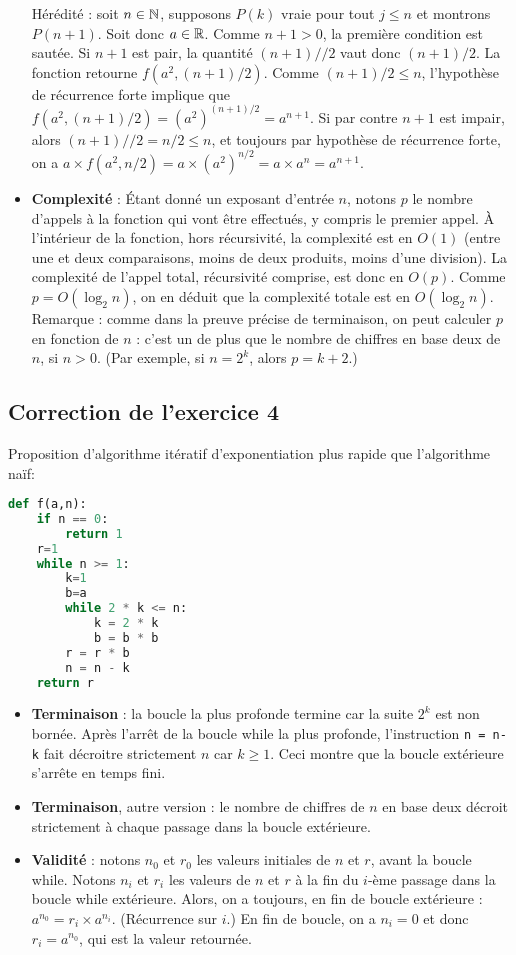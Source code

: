 \documentclass[11pt,a4paper]{article}
\begin{document}
\begin{itemize}
Hérédité : soit $n\in \mathbb{N}$, supposons $P(k)$ vraie pour tout $j\leq n$ et montrons $P(n+1)$. Soit donc $a\in \mathbb{R}$. Comme $n+1>0$, la première condition est sautée. Si $n+1$ est pair, la quantité $(n+1)//2$ vaut donc $(n+1)/2$. La fonction retourne $f(a^2,(n+1)/2)$. Comme $(n+1)/2\leq n$, l'hypothèse de récurrence forte implique que $f(a^2,(n+1)/2) = (a^2)^{(n+1)/2} = a^{n+1}$.
Si par contre $n+1$ est impair, alors $(n+1)//2 =n/2\leq n$, et toujours par hypothèse de récurrence forte, on a $a\times f(a^2,n/2) = a\times(a^2)^{n/2} = a\times a^n=a^{n+1}$.
\item \textbf{Complexité} : Étant donné un exposant d'entrée $n$, notons $p$ le nombre d'appels à la fonction qui vont être effectués, y compris le premier appel.
À l'intérieur de la fonction, hors récursivité, la complexité est en $O(1)$ (entre une et deux comparaisons, moins de deux produits, moins d'une division).
La complexité de l'appel total, récursivité comprise, est donc en $O(p)$. Comme $p  = O(\log_2 n)$, on en déduit que la complexité totale est en $O(\log_2 n)$.\\
Remarque : comme dans la preuve précise de terminaison, on peut calculer $p$ en fonction de $n$ : c'est un de plus que le nombre de chiffres en base deux de $n$, si $n>0$. (Par exemple, si $n=2^k$, alors $p=k+2$.) 
\end{itemize}

\subsection*{Correction de l'exercice 4}

Proposition d'algorithme itératif d'exponentiation plus rapide que l'algorithme naïf: 
\begin{lstlisting}[language=Python]
def f(a,n):
	if n == 0:
		return 1
	r=1
	while n >= 1:
		k=1
		b=a
		while 2 * k <= n:
			k = 2 * k
			b = b * b
		r = r * b
		n = n - k
	return r
\end{lstlisting}
\begin{itemize}
\item \textbf{Terminaison} : la boucle la plus profonde termine car la suite $2^k$ est non bornée.
Après l'arrêt de la boucle while la plus profonde, l'instruction \verb+n = n-k+ fait décroitre strictement $n$ car $k\geq 1$. Ceci montre que la boucle extérieure s'arrête en temps fini.
\item \textbf{Terminaison}, autre version : le nombre de chiffres de $n$ en base deux décroit strictement à chaque passage dans la boucle extérieure.
\item \textbf{Validité} : notons $n_0$ et $r_0$ les valeurs initiales de $n$ et $r$, avant la boucle while. Notons $n_i$ et $r_i$ les valeurs de $n$ et $r$ à la fin du $i$-ème passage dans la boucle while extérieure.
Alors, on a toujours, en fin de boucle extérieure : $a^{n_0} = r_i \times a^{n_i}$. (Récurrence sur $i$.)
En fin de boucle, on a $n_i = 0$ et donc $r_i= a^{n_0}$, qui est la valeur retournée.
\end{itemize}
\end{document}
